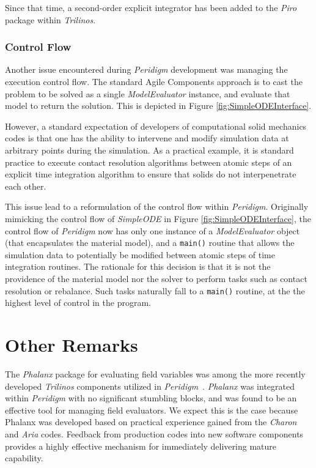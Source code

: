 \documentclass[pdf,ps2pdf,12pt,report]{SANDreport}
\theoremstyle{plain}
\theoremstyle{definition}
\theoremstyle{remark}
\numberwithin{equation}{section}
\begin{document}
Since that time, a second-order explicit integrator has been added to the \emph{Piro} package within \emph{Trilinos}.

\subsubsection{Control Flow}

Another issue encountered during \emph{Peridigm} development was managing the execution control flow. The standard Agile Components approach is to cast the problem to be solved as a single \emph{ModelEvaluator} instance, and evaluate that model to return the solution. This is depicted in Figure \ref{fig:SimpleODEInterface}.

However, a standard expectation of developers of computational solid mechanics codes is that one has the ability to intervene and modify simulation data at arbitrary points during the simulation. As a practical example, it is standard practice to execute contact resolution algorithms between atomic steps of an explicit time integration algorithm to ensure that solids do not interpenetrate each other.

This issue lead to a reformulation of the control flow within \emph{Peridigm}. Originally mimicking the control flow of \emph{SimpleODE} in Figure \ref{fig:SimpleODEInterface}, the control flow of \emph{Peridigm} now has only one instance of a \emph{ModelEvaluator} object (that encapsulates the material model), and a \verb"main()" routine that allows the simulation data to potentially be modified between atomic steps of time integration routines. The rationale for this decision is that it is not the providence of the material model nor the solver to perform tasks such as contact resolution or rebalance. Such tasks naturally fall to a \verb"main()" routine, at the the highest level of control in the program.

\section{Other Remarks}

The \emph{Phalanx} package for evaluating field variables was among the more recently developed \emph{Trilinos} components utilized in \emph{Peridigm}~\cite{PhalanxWebPage:2011}.  \emph{Phalanx} was integrated within \emph{Peridigm} with no significant stumbling blocks, and was found to be an effective tool for managing field evaluators.  We expect this is the case because Phalanx was developed based on practical experience gained from the \emph{Charon} and \emph{Aria} codes. Feedback from production codes into new software components provides a highly effective mechanism for immediately delivering mature capability.
\end{document}
